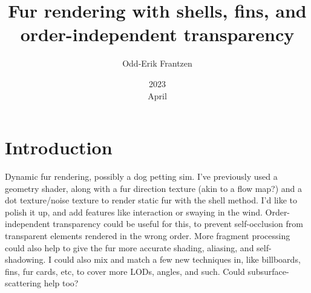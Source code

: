 \documentclass[a4paper, 12pt]{article}
\title{Fur rendering with shells, fins, and order-independent transparency}
\date{2023\\ April}
\author{Odd-Erik Frantzen}
\begin{document}
    \maketitle
    \section{Introduction}
    Dynamic fur rendering, possibly a dog petting sim. I've previously used a geometry shader, along with a fur direction texture (akin to a flow map?) and a dot texture/noise texture to render static fur with the shell method.
    I'd like to polish it up, and add features like interaction or swaying in the wind.
    Order-independent transparency could be useful for this, to prevent self-occlusion from transparent elements rendered in the wrong order. More fragment processing could also help to give the fur more accurate shading, aliasing, and self-shadowing. I could also mix and match a few new techniques in, like billboards, fins, fur cards, etc, to cover more LODs, angles, and such.
    Could subsurface-scattering help too?
\end{document}
